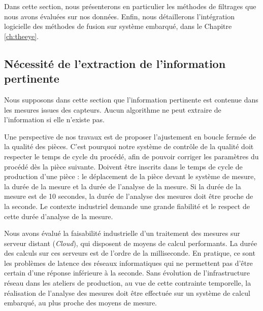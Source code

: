 Dans cette section, nous présenterons en particulier les méthodes de filtrages que nous avons évaluées sur nos données.
Enfin, nous détaillerons l'intégration logicielle des méthodes de fusion sur système embarqué, dans le Chapitre \ref{ch:theeye}.

\subsection{Nécessité de l'extraction de l'information pertinente} \label{subsec:extraction}
Nous supposons dans cette section que l'information pertinente est contenue dans les mesures issues des capteurs.
Aucun algorithme ne peut extraire de l'information si elle n'existe pas.

Une perspective de nos travaux est de proposer l'ajustement en boucle fermée de la qualité des pièces.
C'est pourquoi notre système de contrôle de la qualité doit respecter le temps de cycle du procédé, afin de pouvoir corriger les paramètres du procédé dès la pièce suivante.
Doivent être inscrits dans le temps de cycle de production d'une pièce : le déplacement de la pièce devant le système de mesure, la durée de la mesure et la durée de l'analyse de la mesure.
Si la durée de la mesure est de 10 secondes, la durée de l'analyse des mesures doit être proche de la seconde.
Le contexte industriel demande une grande fiabilité  et le respect de cette durée d'analyse de la mesure.

Nous avons évalué la faisabilité industrielle d'un traitement des mesures sur serveur distant (\textit{Cloud}), qui disposent de moyens de calcul performants.
La durée des calculs sur ces serveurs est de l'ordre de la milliseconde.
En pratique, ce sont les problèmes de latence des réseaux informatiques qui ne permettent pas d'être certain d'une réponse inférieure à la seconde.
Sans évolution de l'infrastructure réseau dans les ateliers de production, au vue de cette contrainte temporelle, la réalisation de l'analyse des mesures doit être effectuée sur un système de calcul embarqué, au plus proche des moyens de mesure.

